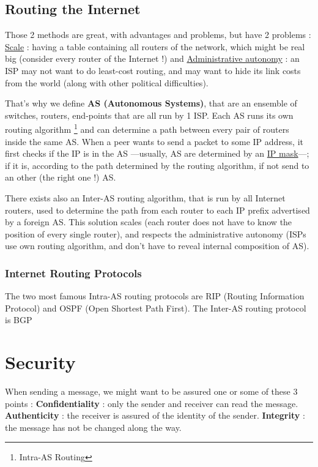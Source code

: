 \documentclass[12pt,a4paper]{article}
\begin{document}
\subsection{Routing the Internet}
Those 2 methods are great, with advantages and problems, but have 2 problems : \uline{Scale} : having a table containing all routers of the network, which might be real big (consider every router of the Internet !) and \uline{Administrative autonomy} : an ISP may not want to do least-cost routing, and may want to hide its link costs from the world (along with other political difficulties). 

That's why we define \textbf{AS (Autonomous Systems)}, that are an ensemble of switches, routers, end-points that are all run by 1 ISP. Each AS runs its own routing algorithm \footnote{Intra-AS Routing} and can determine a path between every pair of routers inside the same AS. When a peer wants to send a packet to some IP address, it first checks if the IP is in the AS ---usually, AS are determined by an \hyperlink{IP mask}{IP mask}---; if it is, according to the path determined by the routing algorithm, if not send to an other (the right one !) AS.

There exists also an Inter-AS routing algorithm, that is run by all Internet routers, used to determine the path from each router to each IP prefix advertised by a foreign AS. This solution scales (each router does not have to know the position of every single router), and respects the administrative autonomy (ISPs use own routing algorithm, and don't have to reveal internal composition of AS).

\subsubsection{Internet Routing Protocols}
The two most famous Intra-AS routing protocols are RIP (Routing Information Protocol) and OSPF (Open Shortest Path First). The Inter-AS routing protocol is BGP


\section{Security}
When sending a message, we might want to be assured one or some of these 3 points : \textbf{Confidentiality} : only the sender and receiver can read the message. \textbf{Authenticity} : the receiver is assured of the identity of the sender. \textbf{Integrity} : the message has not be changed along the way.
\end{document}
